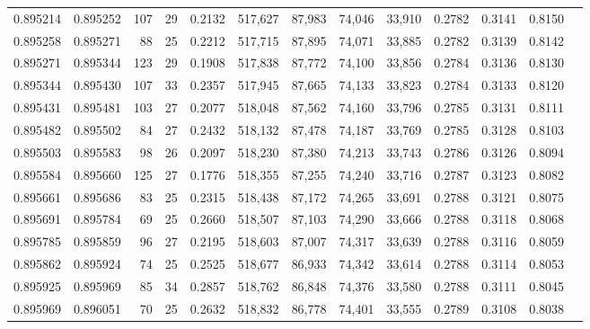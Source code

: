 \begin{tabular}{rrrrrrrrrrrrr}
0.895214 & 0.895252 &   107 &  29 &                                     0.2132 & 517,627 &  87,983 &  74,046 &  33,910 & 0.2782 & 0.3141 & 0.8150 \\
0.895258 & 0.895271 &    88 &  25 &                                     0.2212 & 517,715 &  87,895 &  74,071 &  33,885 & 0.2782 & 0.3139 & 0.8142 \\
0.895271 & 0.895344 &   123 &  29 &                                     0.1908 & 517,838 &  87,772 &  74,100 &  33,856 & 0.2784 & 0.3136 & 0.8130 \\
0.895344 & 0.895430 &   107 &  33 &                                     0.2357 & 517,945 &  87,665 &  74,133 &  33,823 & 0.2784 & 0.3133 & 0.8120 \\
0.895431 & 0.895481 &   103 &  27 &                                     0.2077 & 518,048 &  87,562 &  74,160 &  33,796 & 0.2785 & 0.3131 & 0.8111 \\
0.895482 & 0.895502 &    84 &  27 &                                     0.2432 & 518,132 &  87,478 &  74,187 &  33,769 & 0.2785 & 0.3128 & 0.8103 \\
0.895503 & 0.895583 &    98 &  26 &                                     0.2097 & 518,230 &  87,380 &  74,213 &  33,743 & 0.2786 & 0.3126 & 0.8094 \\
0.895584 & 0.895660 &   125 &  27 &                                     0.1776 & 518,355 &  87,255 &  74,240 &  33,716 & 0.2787 & 0.3123 & 0.8082 \\
0.895661 & 0.895686 &    83 &  25 &                                     0.2315 & 518,438 &  87,172 &  74,265 &  33,691 & 0.2788 & 0.3121 & 0.8075 \\
0.895691 & 0.895784 &    69 &  25 &                                     0.2660 & 518,507 &  87,103 &  74,290 &  33,666 & 0.2788 & 0.3118 & 0.8068 \\
0.895785 & 0.895859 &    96 &  27 &                                     0.2195 & 518,603 &  87,007 &  74,317 &  33,639 & 0.2788 & 0.3116 & 0.8059 \\
0.895862 & 0.895924 &    74 &  25 &                                     0.2525 & 518,677 &  86,933 &  74,342 &  33,614 & 0.2788 & 0.3114 & 0.8053 \\
0.895925 & 0.895969 &    85 &  34 &                                     0.2857 & 518,762 &  86,848 &  74,376 &  33,580 & 0.2788 & 0.3111 & 0.8045 \\
0.895969 & 0.896051 &    70 &  25 &                                     0.2632 & 518,832 &  86,778 &  74,401 &  33,555 & 0.2789 & 0.3108 & 0.8038 \\

\end{tabular}
